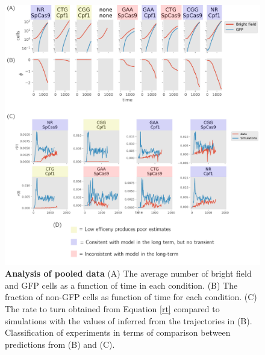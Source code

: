 \documentclass{article}
\begin{document}
\begin{figure}[h!]
\centering
\includegraphics[scale=0.6]{fig1.pdf}
\caption{{\bf Analysis of pooled data} (A) The average number of bright field and GFP cells as a function of time in each condition.  (B) The fraction of non-GFP cells as function of time for each condition.  (C) The rate to turn obtained from Equation \ref{rt} compared to simulations with the values of inferred from the trajectories in (B). Classification of experiments in terms of comparison between predictions from (B) and (C). }\label{fig:1}
\end{figure}
\end{document}
